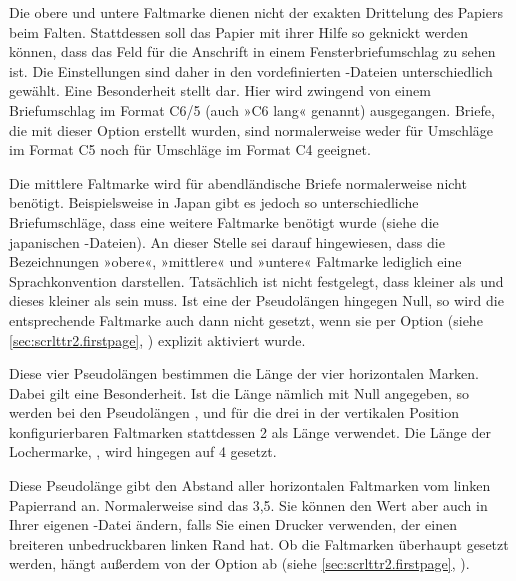 Die obere und untere Faltmarke dienen nicht der exakten
Drittelung des Papiers beim Falten. Stattdessen soll das Papier mit ihrer
Hilfe so geknickt werden können, dass das Feld für die Anschrift in einem
Fensterbriefumschlag zu sehen ist. Die Einstellungen sind daher in den
vordefinierten -Dateien%
 unterschiedlich gewählt. Eine
Besonderheit stellt  dar. Hier wird
zwingend von einem Briefumschlag im Format C6/5 (auch »C6 lang« genannt)
ausgegangen. Briefe, die mit dieser Option erstellt wurden, sind normalerweise
weder für Umschläge im Format C5 noch für Umschläge im Format C4 geeignet.

Die mittlere Faltmarke wird für abendländische Briefe normalerweise nicht
benötigt. Beispielsweise in Japan gibt es jedoch so unterschiedliche
Briefumschläge, dass eine weitere Faltmarke benötigt wurde (siehe die
japanischen -Dateien). An dieser Stelle sei darauf hingewiesen, dass
die Bezeichnungen »obere«, »mittlere« und »untere« Faltmarke lediglich eine
Sprachkonvention darstellen. Tatsächlich ist nicht festgelegt, dass
 kleiner als  und dieses kleiner
als  sein muss. Ist eine der
Pseudolängen hingegen Null, so wird die entsprechende Faltmarke auch dann
nicht gesetzt, wenn sie per Option %
%
 (siehe
\autoref{sec:scrlttr2.firstpage}, )
explizit aktiviert wurde.%
%
\EndIndexGroup


\begin{Declaration}
\end{Declaration}
Diese vier Pseudolängen bestimmen die
Länge der vier horizontalen Marken. Dabei gilt eine
Besonderheit. Ist die Länge nämlich mit Null angegeben, so
werden bei den Pseudolängen ,
 und  für die drei in der
vertikalen Position konfigurierbaren Faltmarken stattdessen 2 als
Länge verwendet. Die Länge der Lochermarke, , wird
hingegen auf 4 gesetzt.%
\EndIndexGroup


\begin{Declaration}
\end{Declaration}
Diese Pseudolänge gibt den Abstand aller horizontalen Faltmarken vom linken
Papier\-rand an.  Normalerweise sind das 3{,}5. Sie
können den Wert aber auch in Ihrer eigenen -Datei ändern, falls Sie
einen Drucker verwenden, der einen breiteren unbedruckbaren linken Rand
hat. Ob die Faltmarken überhaupt gesetzt werden, hängt außerdem von der Option
%
 ab (siehe
\autoref{sec:scrlttr2.firstpage}, ).%
%
\EndIndexGroup


